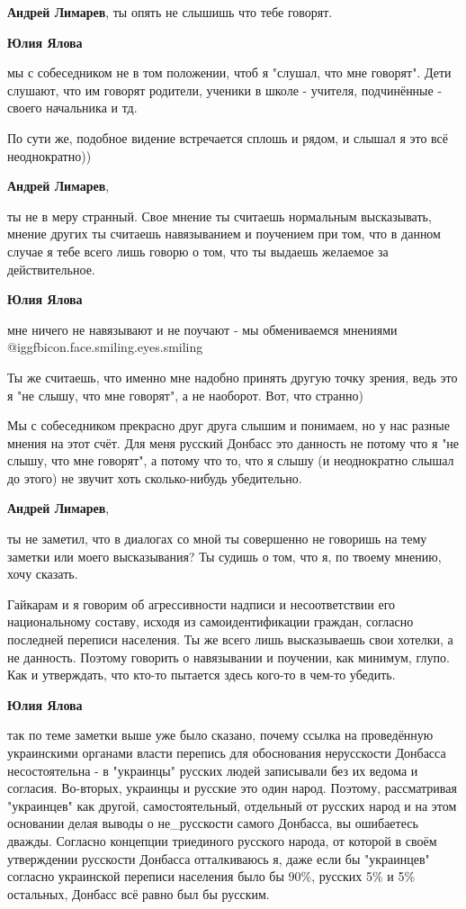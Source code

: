 \begin{itemize}
\begin{itemize}
\textbf{Андрей Лимарев}, ты опять не слышишь что тебе говорят.

\textbf{Юлия Ялова} 

мы с собеседником не в том положении, чтоб я "слушал, что мне говорят". Дети
слушают, что им говорят родители, ученики в школе - учителя, подчинённые -
своего начальника и тд.

По сути же, подобное видение встречается сплошь и рядом, и слышал я это всё
неоднократно))


\textbf{Андрей Лимарев}, 

ты не в меру странный. Свое мнение ты считаешь нормальным высказывать, мнение
других ты считаешь навязыванием и поучением при том, что в данном случае я тебе
всего лишь говорю о том, что ты выдаешь желаемое за действительное.

\textbf{Юлия Ялова} 

мне ничего не навязывают и не поучают - мы обмениваемся мнениями  @igg{fbicon.face.smiling.eyes.smiling} 

Ты же считаешь, что именно мне надобно принять другую точку зрения, ведь это я
"не слышу, что мне говорят", а не наоборот. Вот, что странно)

Мы с собеседником прекрасно друг друга слышим и понимаем, но у нас разные
мнения на этот счёт. Для меня русский Донбасс это данность не потому что я "не
слышу, что мне говорят", а потому что то, что я слышу (и неоднократно слышал до
этого) не звучит хоть сколько-нибудь убедительно.

\textbf{Андрей Лимарев}, 

ты не заметил, что в диалогах со мной ты совершенно не говоришь на тему заметки
или моего высказывания? Ты судишь о том, что я, по твоему мнению, хочу сказать.

Гайкарам и я говорим об агрессивности надписи и несоответствии его
национальному составу, исходя из самоидентификации граждан, согласно последней
переписи населения. Ты же всего лишь высказываешь свои хотелки, а не данность.
Поэтому говорить о навязывании и поучении, как минимум, глупо. Как и
утверждать, что кто-то пытается здесь кого-то в чем-то убедить.


\textbf{Юлия Ялова} 

так по теме заметки выше уже было сказано, почему ссылка на проведённую
украинскими органами власти перепись для обоснования нерусскости Донбасса
несостоятельна - в "украинцы" русских людей записывали без их ведома и
согласия. Во-вторых, украинцы и русские это один народ. Поэтому, рассматривая
"украинцев" как другой, самостоятельный, отдельный от русских народ и на этом
основании делая выводы о не\_русскости самого Донбасса, вы ошибаетесь дважды.
Согласно концепции триединого русского народа, от которой в своём утверждении
русскости Донбасса отталкиваюсь я, даже если бы "украинцев" согласно украинской
переписи населения было бы 90\%, русских 5\% и 5\% остальных, Донбасс всё равно
был бы русским.


\end{itemize}
\end{itemize}
